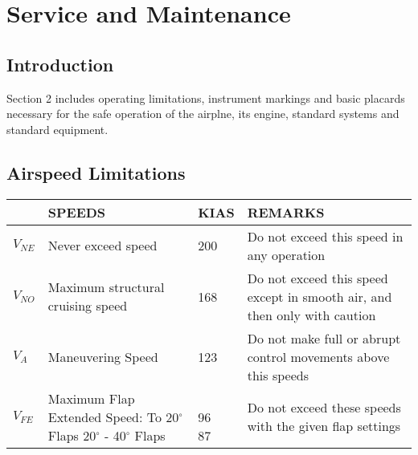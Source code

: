 \chapter{Service and Maintenance}
\thispagestyle{fancy}
\minitoc[n] %

\section{Introduction}
Section 2 includes operating limitations, instrument markings and basic placards necessary for the safe operation of the airplne, its engine, standard systems and standard equipment.

\section{Airspeed Limitations}


\begin{center}
\begin{tabular}{ |p{1cm}|p{6cm}|p{2cm}|p{5cm}| } 
 \hline
  & SPEEDS &  KIAS & REMARKS\\ 
 \hline
 $V_{NE}$ & Never exceed speed & 200 & Do not exceed this speed in any operation\\ 
 \hline
 $V_{NO}$ & Maximum structural cruising speed & 168  & Do not exceed this speed except in smooth air, and then only with caution\\ 
 \hline
 $V_{A}$ & Maneuvering Speed & 123  & Do not make full or abrupt control movements above this speeds \\ 
 \hline
 $V_{FE}$  & \shortstack[l]{Maximum Flap Extended Speed: \\To 20$^{\circ}$ Flaps\\ 20$^{\circ}$ - 40$^{\circ}$ Flaps} & \shortstack[l]{\\96 \\ 87} & Do not exceed these speeds with the given flap settings \\ 
 \hline
\end{tabular}
\end{center}


